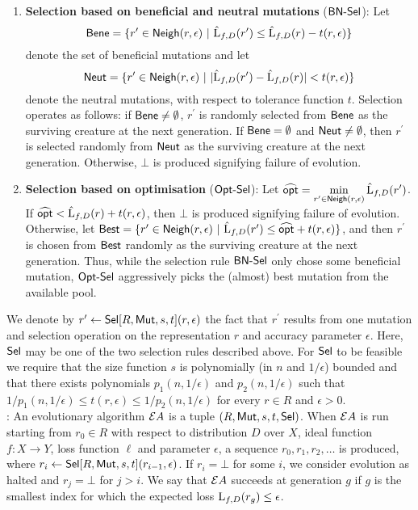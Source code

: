\begin{enumerate}
\item {\bf Selection based on beneficial and neutral mutations} ($\mathsf{BN\mbox{-}Sel}$): Let 
%
\[ \mathsf{Bene} = \{r^\prime \in \mathsf{Neigh}(r, \epsilon) ~|~ \hat{\mathrm{L}}_{f, D}(r^\prime) \leq
\hat{\mathrm{L}}_{f, D}(r) - t(r, \epsilon) \} \]  
%
denote the set of beneficial mutations and let 
%
\[ \mathsf{Neut} = \{r^\prime \in \mathsf{Neigh}(r, \epsilon) ~|~ |\hat{\mathrm{L}}_{f, D}(r^\prime) -
\hat{\mathrm{L}}_{f, D}(r)| <  t(r, \epsilon) \} \]
%
denote the neutral mutations, with respect to tolerance function $t$. Selection
operates as follows: if $\mathsf{Bene} \neq \emptyset$, $r^\prime$ is randomly selected
from $\mathsf{Bene}$ as the surviving creature at the next generation.  If $\mathsf{Bene} =
\emptyset$ and $\mathsf{Neut} \neq\emptyset$, then $r^\prime$ is selected randomly from
$\mathsf{Neut}$ as the surviving creature at the next generation.  Otherwise, $\bot$ is
produced signifying failure of evolution.
%
\item {\bf Selection based on optimisation} ($\mathsf{Opt\mbox{-}Sel}$): Let $\widehat{\mathsf{opt}} =
\displaystyle\min_{r^\prime \in \mathsf{Neigh}(r, \epsilon)} \hat{\mathrm{L}}_{f, D}(r^\prime)$.
If $\widehat{\mathsf{opt}} < \hat{\mathrm{L}}_{f, D}(r) + t(r, \epsilon)$, then $\bot$ is produced
signifying failure of evolution.  Otherwise, let $\mathsf{Best} = \{ r^\prime \in
\mathsf{Neigh}(r, \epsilon) ~|~ \hat{\mathrm{L}}_{f, D}(r^\prime) \leq \widehat{\mathsf{opt}} + t(r, \epsilon) \}$,
and then $r^\prime$ is chosen from $\mathsf{Best}$ randomly as the surviving creature at the
next generation. Thus, while the selection rule $\mathsf{BN\mbox{-}Sel}$ only chose some
beneficial mutation, $\mathsf{Opt\mbox{-}Sel}$ aggressively picks the (almost) best mutation
from the available pool.
\end{enumerate}

We denote by $r^\prime \leftarrow \mathsf{Sel}[R, \mathsf{Mut}, s, t](r, \epsilon)$ the fact
that $r^\prime$ results from one mutation and selection operation on the
representation $r$ and accuracy parameter $\epsilon$. Here, $\mathsf{Sel}$ may be one of
the two selection rules described above. For $\mathsf{Sel}$ to be feasible we require
that the size function $s$ is polynomially (in $n$ and $1/\epsilon$) bounded and
that there exists polynomials $p_1(n, 1/\epsilon)$ and $p_2(n, 1/\epsilon)$
such that $1/p_1(n, 1/\epsilon) \leq t(r, \epsilon) \leq 1/p_2(n, 1/\epsilon)$ for
every $r \in R$ and $\epsilon > 0$. \medskip \\
%
: An evolutionary algorithm ${\mathcal EA}$ is a
tuple $(R, \mathsf{Mut}, s, t, \mathsf{Sel})$. When ${\mathcal EA}$ is run starting from $r_0 \in R$
with respect to distribution $D$ over $X$, ideal function $f : X \rightarrow Y$,
loss function $\ell$ and parameter $\epsilon$, a sequence $r_0, r_1, r_2,
\ldots$ is produced, where $r_i \leftarrow \mathsf{Sel}[R, \mathsf{Mut}, s, t](r_{i - 1},
\epsilon)$. If $r_i = \bot$ for some $i$, we consider evolution as halted and
$r_j = \bot$ for $j > i$. We say that ${\mathcal EA}$ succeeds at generation $g$ if
$g$ is the smallest index for which the expected loss $\mathrm{L}_{f, D}(r_g) \leq
\epsilon$.

